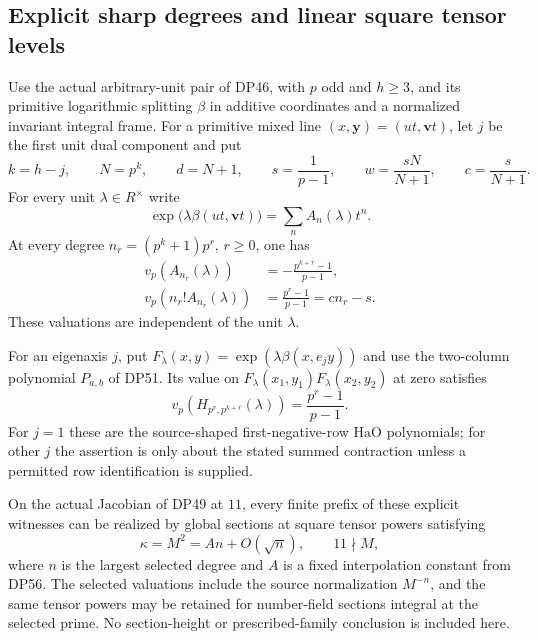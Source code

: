 \subsection{Explicit sharp degrees and linear square tensor levels}

\begin{theorem}\label{DP58}
Use the actual arbitrary-unit pair of DP46, with $p$ odd and $h\ge3$, and its primitive logarithmic splitting $\beta$ in additive coordinates and a normalized invariant integral frame.
For a primitive mixed line $(x,\mathbf y)=(ut,\mathbf vt)$, let $j$ be the first unit dual component and put
\[
 k=h-j,\qquad N=p^k,\qquad d=N+1,\qquad
 s=\frac1{p-1},\qquad
 w=\frac{sN}{N+1},\qquad c=\frac{s}{N+1}.
\]
For every unit $\lambda\in R^\times$ write
\[
 \exp\bigl(\lambda\beta(ut,\mathbf vt)\bigr)
 =\sum_n A_n(\lambda)t^n.
\]
At every degree $n_r=(p^k+1)p^r$, $r\ge0$, one has
\begin{align}
 v_p(A_{n_r}(\lambda))
 &=-\frac{p^{k+r}-1}{p-1},\label{eq:explicitkernelcoefficient}\\
 v_p(n_r!A_{n_r}(\lambda))
 &=\frac{p^r-1}{p-1}=cn_r-s.\label{eq:explicitkerneljet}
\end{align}
These valuations are independent of the unit $\lambda$.

For an eigenaxis $j$, put
$F_\lambda(x,y)=\exp(\lambda\beta(x,e_jy))$ and use the two-column polynomial $P_{a,b}$ of DP51.
Its value on $F_\lambda(x_1,y_1)F_\lambda(x_2,y_2)$ at zero satisfies
\begin{equation}\label{eq:explicitharmonicjet}
 v_p(H_{p^r,p^{k+r}}(\lambda))
 =\frac{p^r-1}{p-1}.
\end{equation}
For $j=1$ these are the source-shaped first-negative-row $\mathrm{HaO}$ polynomials; for other $j$ the assertion is only about the stated summed contraction unless a permitted row identification is supplied.

On the actual Jacobian of DP49 at $11$, every finite prefix of these explicit witnesses can be realized by global sections at square tensor powers satisfying
\[
 \kappa=M^2=An+O(\sqrt n),\qquad 11\nmid M,
\]
where $n$ is the largest selected degree and $A$ is a fixed interpolation constant from DP56.
The selected valuations include the source normalization $M^{-n}$, and the same tensor powers may be retained for number-field sections integral at the selected prime.
No section-height or prescribed-family conclusion is included here.
\end{theorem}

